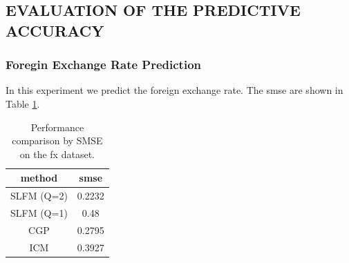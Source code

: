 \subsection{EVALUATION OF THE PREDICTIVE ACCURACY}
\subsubsection{Foregin Exchange Rate Prediction}
In this experiment we predict the foreign exchange rate.
The smse are shown in Table \ref{tab:fx}.

\begin{table}[h]
\caption{Performance comparison by SMSE on the fx dataset.}
\label{tab:fx}
\begin{center}
\begin{tabular}{c|c}
method & smse \\ \hline
SLFM (Q=2) & 0.2232 \\
SLFM (Q=1) & 0.48 \\
CGP & 0.2795 \\
ICM & 0.3927
\end{tabular}
\end{center}
\end{table}

